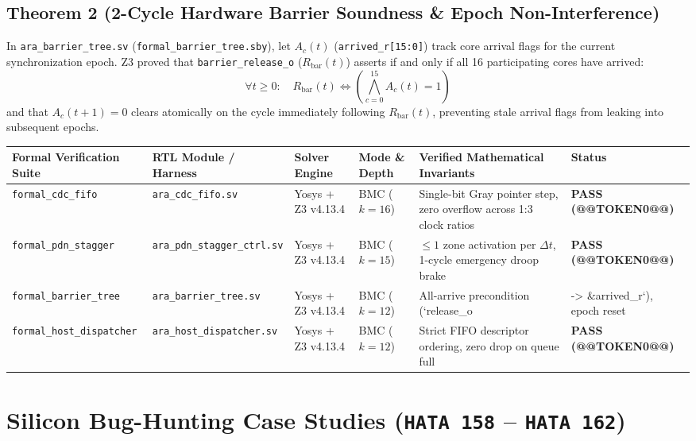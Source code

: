 \documentclass[journal,10pt,twocolumn]{IEEEtran}
\begin{document}
\subsection{Theorem 2 (2-Cycle Hardware Barrier Soundness \& Epoch Non-Interference)}
In \texttt{ara\_barrier\_tree.sv} (\texttt{formal\_barrier\_tree.sby}), let $A_c(t)$ (\texttt{arrived\_r[15:0]}) track core arrival flags for the current synchronization epoch. Z3 proved that \texttt{barrier\_release\_o} ($R_{\mathrm{bar}}(t)$) asserts if and only if all 16 participating cores have arrived:
$$\forall t \ge 0:\quad R_{\mathrm{bar}}(t) \iff \left(\bigwedge_{c=0}^{15} A_c(t) = 1\right)$$
and that $A_c(t+1) = 0$ clears atomically on the cycle immediately following $R_{\mathrm{bar}}(t)$, preventing stale arrival flags from leaking into subsequent epochs.

\begin{table}[htbp]
\centering\footnotesize
\begin{tabular}{p{} p{} p{} p{} p{} p{}}
\toprule
\textbf{Formal Verification Suite} & \textbf{RTL Module / Harness} & \textbf{Solver Engine} & \textbf{Mode \& Depth} & \textbf{Verified Mathematical Invariants} & \textbf{Status} \\
\midrule
\texttt{formal\_cdc\_fifo} & \texttt{ara\_cdc\_fifo.sv} & Yosys + Z3 v4.13.4 & BMC ($k=16$) & Single-bit Gray pointer step, zero overflow across 1:3 clock ratios & \textbf{PASS (@@TOKEN0@@)} \\
\texttt{formal\_pdn\_stagger} & \texttt{ara\_pdn\_stagger\_ctrl.sv} & Yosys + Z3 v4.13.4 & BMC ($k=15$) & $\le 1$ zone activation per $\Delta t$, 1-cycle emergency droop brake & \textbf{PASS (@@TOKEN0@@)} \\
\texttt{formal\_barrier\_tree} & \texttt{ara\_barrier\_tree.sv} & Yosys + Z3 v4.13.4 & BMC ($k=12$) & All-arrive precondition (`release\_o & -> \&arrived\_r`), epoch reset \\
\texttt{formal\_host\_dispatcher} & \texttt{ara\_host\_dispatcher.sv} & Yosys + Z3 v4.13.4 & BMC ($k=12$) & Strict FIFO descriptor ordering, zero drop on queue full & \textbf{PASS (@@TOKEN0@@)} \\
\bottomrule
\end{tabular}
\vspace{4pt}
\end{table}


\section{Silicon Bug-Hunting Case Studies (\texttt{HATA 158} – \texttt{HATA 162})}
\end{document}
